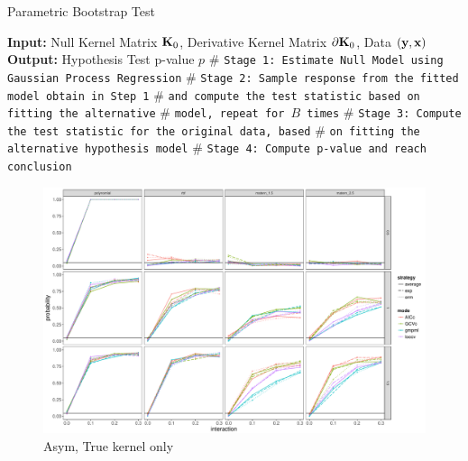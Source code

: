 \documentclass[11pt]{article}
\begin{document}
\begin{algorithm}
\caption{Parametric Bootstrap Test} 
\label{alg:cvek}
\begin{algorithmic}[1]
\newline
\textbf{Input:} Null Kernel Matrix ${\bf K}_0$, Derivative Kernel Matrix $\partial {\bf K}_0$, Data $({\bf y}, {\bf x})$\newline
\textbf{Output:} Hypothesis Test p-value $p$\newline
$\#$ \texttt{Stage 1: Estimate Null Model using Gaussian Process Regression}
\newline
$\#$ \texttt{Stage 2: Sample response from the fitted model obtain in Step 1}
\newline
$\#$ \texttt{and compute the test statistic based on fitting the alternative}
\newline
$\#$ \texttt{model, repeat for $B$ times}
\EndFor 
\newline
$\#$ \texttt{Stage 3: Compute the test statistic for the original data, based}
\newline
$\#$ \texttt{on fitting the alternative hypothesis model}
\newline
$\#$ \texttt{Stage 4: Compute p-value and reach conclusion}
\EndProcedure
\end{algorithmic}
\end{algorithm}

\clearpage

\begin{figure}
\begin{center}
\includegraphics[width=0.9\columnwidth]{A1} 
\caption{Asym, True kernel only}
\label{fig:res}
\end{center}
\end{figure}
\end{document}
